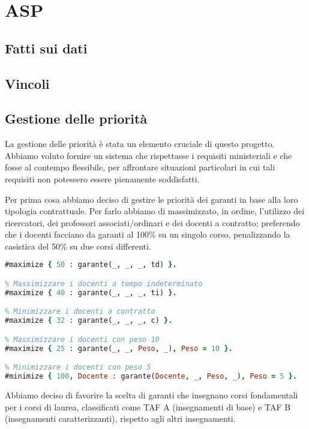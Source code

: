 \section{ASP}\label{sec:asp}

\subsection{Fatti sui dati}\label{sec:facts}
\subsection{Vincoli}\label{sec:constraints}
\subsection{Gestione delle priorità}\label{sec:priorita}

La gestione delle priorità è stata un elemento cruciale di questo progetto.
Abbiamo voluto fornire un sistema che rispettasse i requisiti ministeriali e
che fosse al contempo flessibile, per affrontare situazioni particolari in cui
tali requisiti non potessero essere pienamente soddisfatti.

Per prima cosa abbiamo deciso di gestire le priorità dei garanti in base alla loro tipologia contrattuale.
Per farlo abbiamo di massimizzato, in ordine, l'utilizzo dei ricercatori, dei professori associati/ordinari e dei docenti a contratto;
preferendo che i docenti facciano da garanti al 100\% su un singolo corso, penalizzando la casistica
del 50\% su due corsi differenti.

\begin{lstlisting}[language=prolog, caption=Gestione delle priorità dei docenti]
% Massimizzare i docenti a tempo determinato (ricercatori)
#maximize { 50 : garante(_, _, _, td) }.

% Massimizzare i docenti a tempo indeterminato
#maximize { 40 : garante(_, _, _, ti) }.

% Minimizzare i docenti a contratto
#maximize { 32 : garante(_, _, _, c) }.

% Massimizzare i docenti con peso 10
#maximize { 25 : garante(_, _, Peso, _), Peso = 10 }.

% Minimizzare i docenti con peso 5
#minimize { 100, Docente : garante(Docente, _, Peso, _), Peso = 5 }.
\end{lstlisting}

Abbiamo deciso di favorire la scelta di garanti che insegnano corsi fondamentali per
i corsi di laurea, classificati come TAF A (insegnamenti di base) e TAF B
(insegnamenti caratterizzanti), rispetto agli altri insegnamenti.

